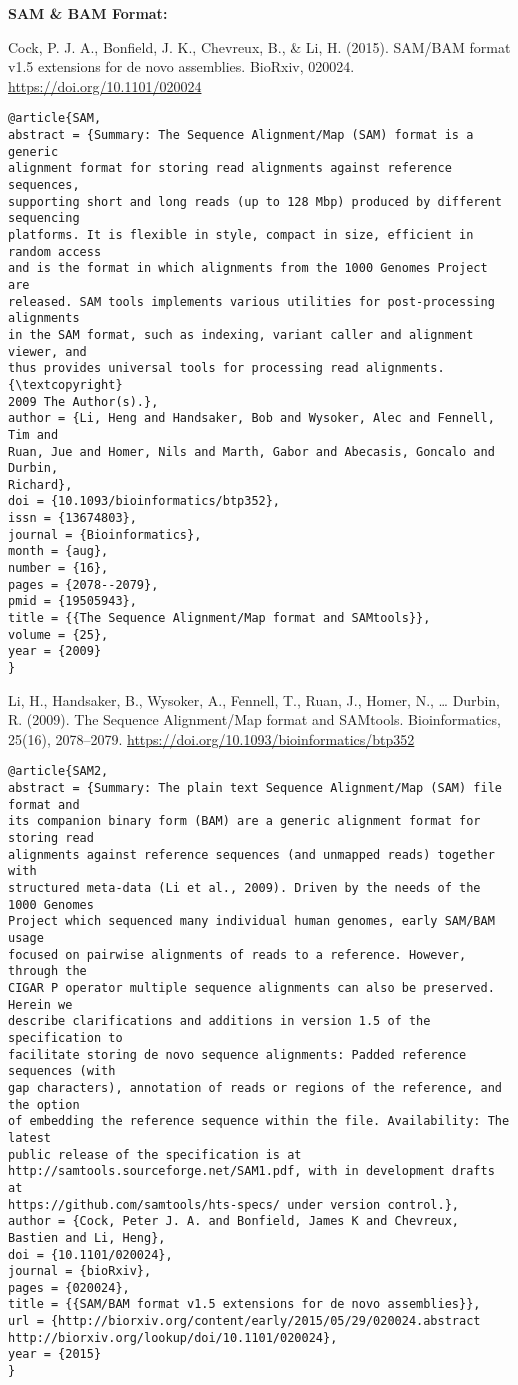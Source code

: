 \documentclass[]{article}
\begin{document}
\textbf{SAM \& BAM Format:}

Cock, P. J. A., Bonfield, J. K., Chevreux, B., \& Li, H. (2015). SAM/BAM format v1.5 extensions for de novo assemblies. BioRxiv, 020024. \url{https://doi.org/10.1101/020024}

\begin{verbatim}
@article{SAM,
abstract = {Summary: The Sequence Alignment/Map (SAM) format is a generic
alignment format for storing read alignments against reference sequences,
supporting short and long reads (up to 128 Mbp) produced by different sequencing
platforms. It is flexible in style, compact in size, efficient in random access
and is the format in which alignments from the 1000 Genomes Project are
released. SAM tools implements various utilities for post-processing alignments
in the SAM format, such as indexing, variant caller and alignment viewer, and
thus provides universal tools for processing read alignments. {\textcopyright}
2009 The Author(s).},
author = {Li, Heng and Handsaker, Bob and Wysoker, Alec and Fennell, Tim and
Ruan, Jue and Homer, Nils and Marth, Gabor and Abecasis, Goncalo and Durbin,
Richard},
doi = {10.1093/bioinformatics/btp352},
issn = {13674803},
journal = {Bioinformatics},
month = {aug},
number = {16},
pages = {2078--2079},
pmid = {19505943},
title = {{The Sequence Alignment/Map format and SAMtools}},
volume = {25},
year = {2009}
}
\end{verbatim}

Li, H., Handsaker, B., Wysoker, A., Fennell, T., Ruan, J., Homer, N., … Durbin, R. (2009). The Sequence Alignment/Map format and SAMtools. Bioinformatics, 25(16), 2078–2079. \url{https://doi.org/10.1093/bioinformatics/btp352}

\begin{verbatim}
@article{SAM2,
abstract = {Summary: The plain text Sequence Alignment/Map (SAM) file format and
its companion binary form (BAM) are a generic alignment format for storing read
alignments against reference sequences (and unmapped reads) together with
structured meta-data (Li et al., 2009). Driven by the needs of the 1000 Genomes
Project which sequenced many individual human genomes, early SAM/BAM usage
focused on pairwise alignments of reads to a reference. However, through the
CIGAR P operator multiple sequence alignments can also be preserved. Herein we
describe clarifications and additions in version 1.5 of the specification to
facilitate storing de novo sequence alignments: Padded reference sequences (with
gap characters), annotation of reads or regions of the reference, and the option
of embedding the reference sequence within the file. Availability: The latest
public release of the specification is at
http://samtools.sourceforge.net/SAM1.pdf, with in development drafts at
https://github.com/samtools/hts-specs/ under version control.},
author = {Cock, Peter J. A. and Bonfield, James K and Chevreux, Bastien and Li, Heng},
doi = {10.1101/020024},
journal = {bioRxiv},
pages = {020024},
title = {{SAM/BAM format v1.5 extensions for de novo assemblies}},
url = {http://biorxiv.org/content/early/2015/05/29/020024.abstract
http://biorxiv.org/lookup/doi/10.1101/020024},
year = {2015}
}
\end{verbatim}
\end{document}
